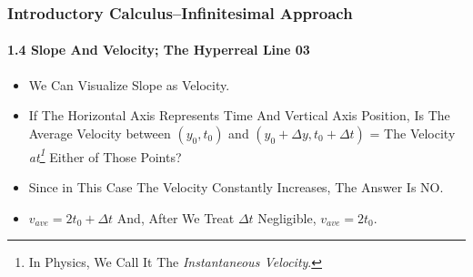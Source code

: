 \begin{frame}
\frametitle{Introductory Calculus--Infinitesimal Approach}
\framesubtitle{1.4 Slope And Velocity; The Hyperreal Line 03}
\label{slide:1.4-03}
\begin{itemize}
\item We Can Visualize \alert{Slope as Velocity}.
\pause\item If The Horizontal Axis Represents Time And Vertical Axis Position, Is \alert{The Average Velocity between $(y_0,t_0)$ and $(y_0+\Delta y, t_0+\Delta t)$} = \alert{The Velocity \textit{at\footnote{In Physics, We Call It The \textit{Instantaneous Velocity}.}} Either} of Those Points?  
\pause\item Since in This Case The Velocity Constantly Increases, The Answer Is \alert{NO}.
\pause\item $v_{ave}=2t_0+\Delta t$ And, \alert{After We Treat $\Delta t$ Negligible}, $v_{ave}=2t_0$. 
\end{itemize}
\end{frame}
